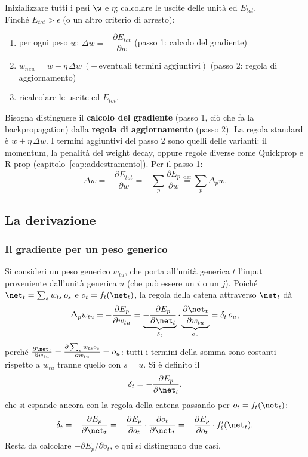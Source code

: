 \begin{algoritmo}
Inizializzare tutti i pesi $\w$ e $\eta$; calcolare le uscite delle unità ed $E_{tot}$.\\
Finché $E_{tot}>\epsilon$ (o un altro criterio di arresto):
\begin{enumerate}
  \item per ogni peso $w$: $\Delta w = -\dfrac{\partial E_{tot}}{\partial w}$ \hfill (passo 1: calcolo del gradiente)
  \item $w_{\mathit{new}} = w + \eta\,\Delta w\ (+\,\text{eventuali termini aggiuntivi})$ \hfill (passo 2: regola di aggiornamento)
  \item ricalcolare le uscite ed $E_{tot}$.
\end{enumerate}
\end{algoritmo}

Bisogna distinguere il \textbf{calcolo del gradiente} (passo 1, ciò che fa la backpropagation) dalla
\textbf{regola di aggiornamento} (passo 2). La regola standard è $w+\eta\,\Delta w$. I termini aggiuntivi del
passo 2 sono quelli delle varianti: il momentum, la penalità del weight decay, oppure regole diverse come
Quickprop e R-prop (capitolo~\ref{cap:addestramento}).
Per il passo 1:
\[
\Delta w = -\frac{\partial E_{tot}}{\partial w} = -\sum_p\frac{\partial E_p}{\partial w} \overset{\mathrm{def}}{=} \sum_p\Delta_pw .
\]

\subsection{La derivazione}

\subsubsection{Il gradiente per un peso generico}
Si consideri un peso generico $w_{tu}$, che porta all'unità generica $t$ l'input proveniente dall'unità generica
$u$ (che può essere un $i$ o un $j$). Poiché $\net_t = \sum_sw_{ts}\,o_s$ e $o_t = f_t(\net_t)$, la regola della
catena attraverso $\net_t$ dà
\begin{equation}\label{eq:bp-generico}
\Delta_pw_{tu} = -\frac{\partial E_p}{\partial w_{tu}}
= \underbrace{-\frac{\partial E_p}{\partial\net_t}}_{\delta_t}\cdot\underbrace{\frac{\partial\net_t}{\partial w_{tu}}}_{o_u}
= \delta_t\,o_u ,
\end{equation}
perché $\frac{\partial\net_t}{\partial w_{tu}} = \frac{\partial\sum_sw_{ts}o_s}{\partial w_{tu}} = o_u$: tutti i
termini della somma sono costanti rispetto a $w_{tu}$ tranne quello con $s=u$. Si è definito il 
\[
\delta_t = -\frac{\partial E_p}{\partial\net_t},
\]
che si espande ancora con la regola della catena passando per $o_t = f_t(\net_t)$:
\begin{equation}\label{eq:delta-generico}
\delta_t = -\frac{\partial E_p}{\partial\net_t} = -\frac{\partial E_p}{\partial o_t}\cdot\frac{\partial o_t}{\partial\net_t} = -\frac{\partial E_p}{\partial o_t}\cdot f'_t(\net_t).
\end{equation}
Resta da calcolare $-\partial E_p/\partial o_t$, e qui si distinguono due casi.


